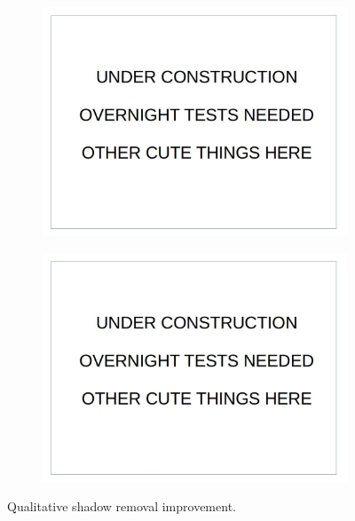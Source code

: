 \documentclass[12pt]{report}
\begin{document}
\begin{figure}
\begin{subfigure}{.49\linewidth}
  \includegraphics[width=1\linewidth]{figures/placeholder.jpg}
  \caption{}
  \end{subfigure}
  \hfill
  \begin{subfigure}{.49\linewidth}
  \includegraphics[width=1\linewidth]{figures/placeholder.jpg}
  \caption{}
  \end{subfigure}
\caption{Qualitative shadow removal improvement.}
\label{fig:qual_results}
\end{figure} 
\end{document}
